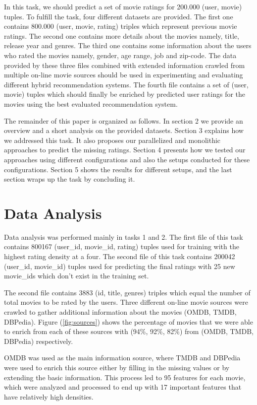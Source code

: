 \documentclass{sigish}
\begin{document}
In this task, we should predict a set of movie ratings for 200.000 (user, movie) tuples. To fulfill the task, four different datasets are provided. The first one contains 800.000 (user, movie, rating) triples which represent previous movie ratings. The second one contains more details about the movies namely, title, release year and genres. The third one contains some information about the users who rated the movies namely, gender, age range, job and zip-code. The data provided by these three files combined with extended information crawled from multiple on-line movie sources should be used in experimenting and evaluating different hybrid recommendation systems. The fourth file contains a set of (user, movie) tuples which should finally be enriched by predicted user ratings for the movies using the best evaluated recommendation system.

The remainder of this paper is organized as follows. In section 2 we provide an overview and a short analysis on the provided datasets. Section 3 explains how we addressed this task. It also proposes our parallelized and monolithic approaches to predict the missing ratings. Section 4 presents how we tested our approaches using different configurations and also the setups conducted for these configurations. Section 5 shows the results for different setups, and the last section wraps up the task by concluding it.

\section{Data Analysis}

Data analysis was performed mainly in tasks 1 and 2. The first file of this task contains 800167 (user\_id, movie\_id, rating) tuples used for training with the highest rating density at a four. The second file of this task contains 200042 (user\_id, movie\_id) tuples used for predicting the final ratings with 25 new movie\_ids which don't exist in the training set.

The second file contains 3883 (id, title, genres) triples which equal the number of total movies to be rated by the users. Three different on-line movie sources were crawled to gather additional information about the movies (OMDB, TMDB, DBPedia). Figure (\ref{fig:sources}) shows the percentage of movies that we were able to enrich from each of these sources with (94\%, 92\%, 82\%) from (OMDB, TMDB, DBPedia) respectively.

OMDB was used as the main information source, where TMDB and DBPedia were used to enrich this source either by filling in the missing values or by extending the basic information. This process led to 95 features for each movie, which were analyzed and processed to end up with 17 important features that have relatively high densities.
\end{document}
